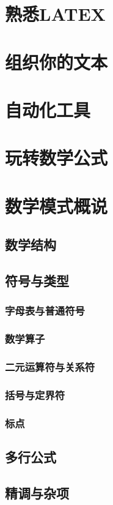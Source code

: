 \documentclass[UTF8]{ctexart}
\begin{document}
\section{熟悉LATEX}

\section{组织你的文本}

\section{自动化工具}


\section{玩转数学公式}

\section{数学模式概说}

\subsection{数学结构}

\subsection{符号与类型}

\subsubsection{字母表与普通符号}

\subsubsection{数学算子}

\subsubsection{二元运算符与关系符}

\subsubsection{括号与定界符}

\subsubsection{标点}



\subsection{多行公式}

\subsection{精调与杂项}
\end{document}
